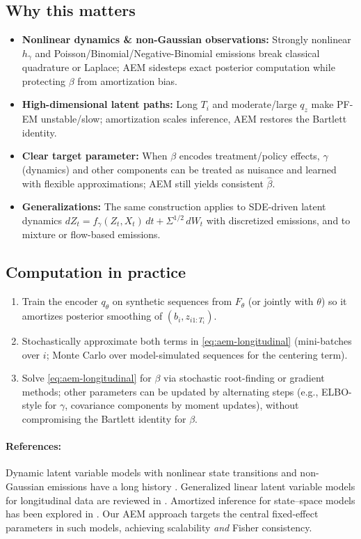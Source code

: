 \subsection{Why this matters}
\begin{itemize}
\item \textbf{Nonlinear dynamics \& non-Gaussian observations:} Strongly nonlinear \(h_\gamma\) and Poisson/Binomial/Negative-Binomial emissions break classical quadrature or Laplace; AEM sidesteps exact posterior computation while protecting \(\beta\) from amortization bias.
\item \textbf{High-dimensional latent paths:} Long \(T_i\) and moderate/large \(q_z\) make PF-EM unstable/slow; amortization scales inference, AEM restores the Bartlett identity.
\item \textbf{Clear target parameter:} When \(\beta\) encodes treatment/policy effects, \(\gamma\) (dynamics) and other components can be treated as nuisance and learned with flexible approximations; AEM still yields consistent \(\hat\beta\).
\item \textbf{Generalizations:} The same construction applies to SDE-driven latent dynamics
\(dZ_t=f_\gamma(Z_t,X_t)\,dt+\Sigma^{1/2}\,dW_t\) with discretized emissions, and to mixture or flow-based emissions.
\end{itemize}

\subsection{Computation in practice}
\begin{enumerate}
\item Train the encoder \(q_\theta\) on synthetic sequences from \(F_\theta\) (or jointly with \(\theta\)) so it amortizes posterior smoothing of \((b_i,z_{i1:T_i})\).
\item Stochastically approximate both terms in \eqref{eq:aem-longitudinal} (mini-batches over \(i\); Monte Carlo over model-simulated sequences for the centering term).
\item Solve \eqref{eq:aem-longitudinal} for \(\beta\) via stochastic root-finding or gradient methods; other parameters can be updated by alternating steps (e.g., ELBO-style for \(\gamma\), covariance components by moment updates), without compromising the Bartlett identity for \(\beta\).
\end{enumerate}






\paragraph{References:} 
Dynamic latent variable models with nonlinear state transitions and non-Gaussian emissions have a long history 
\citep{durbin2012time,hamilton1994time,shumway2017time}. 
Generalized linear latent variable models for longitudinal data are reviewed in 
\citet{moustaki2003generalized,deboeck2013structural}. 
Amortized inference for state--space models has been explored in 
\citet{krishnan2017structured,becker2019recurrent}. 
Our AEM approach targets the central fixed-effect parameters in such models, 
achieving scalability \emph{and} Fisher consistency.


